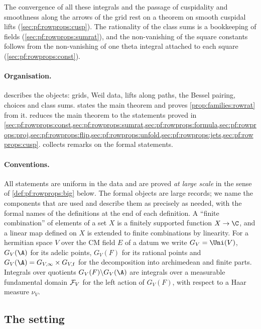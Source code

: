 The convergence of all these integrals and the passage of cuspidality and smoothness along the arrows of the grid
rest on a theorem on smooth cuspidal lifts (\cref{sec:pf:rowprops:cusp}). The rationality of the class sums is a
bookkeeping of fields (\cref{sec:pf:rowprops:sumrat}), and the non-vanishing of the square constants follows from the
non-vanishing of one theta integral attached to each square (\cref{sec:pf:rowprops:const}).

\paragraph{Organisation.}
 describes the objects: grids, Weil data, lifts along paths, the Bessel pairing, choices
and class sums.  states the main theorem and proves \cref{prop:families:rowrat} from it.
 reduces the main theorem to the statements proved in
\cref{sec:pf:rowprops:const,sec:pf:rowprops:sumrat,sec:pf:rowprops:formula,sec:pf:rowprops:proj,sec:pf:rowprops:flip,sec:pf:rowprops:unfold,sec:pf:rowprops:jets,sec:pf:rowprops:cusp}.
 collects remarks on the formal statements.

\paragraph{Conventions.}
All statements are uniform in the data and are proved \emph{at large scale} in the sense of \cref{def:pf:rowprops:big}
below. The formal objects are large records; we name the components that are used and describe them as precisely as
needed, with the formal names of the definitions at the end of each definition. A ``finite combination'' of elements of
a set $X$ is a finitely supported function $X\to\C$, and a linear map defined on $X$ is extended to finite combinations
by linearity. For a hermitian space $V$ over the CM field $E$ of a datum we write $G_V=\Uni(V)$, $G_V(\A)$ for its adelic
points, $G_V(F)$ for its rational points and $G_V(\A)=G_{V,\infty}\times G_{V,\mathrm f}$ for the decomposition into
archimedean and finite parts. Integrals over quotients $G_V(F)\backslash G_V(\A)$ are integrals over a measurable
fundamental domain $\mathcal{F}_V$ for the left action of $G_V(F)$, with respect to a Haar measure $\nu_V$.

\subsection{The setting}\label{sec:pf:rowprops:setting}

